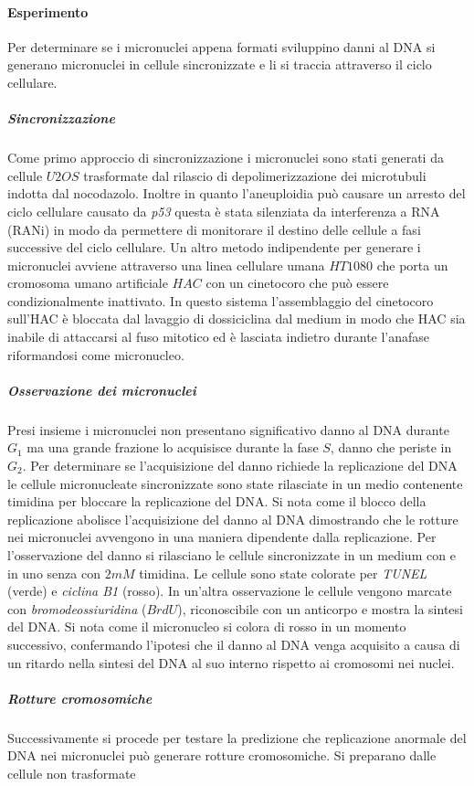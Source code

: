 \paragraph{Esperimento}
Per determinare se i micronuclei appena formati sviluppino danni al DNA si generano micronuclei in cellule sincronizzate e li si traccia attraverso il ciclo cellulare. 
\subparagraph{Sincronizzazione} 
Come primo approccio di sincronizzazione i micronuclei sono stati generati da cellule $U2OS$ trasformate dal rilascio di depolimerizzazione dei microtubuli indotta dal nocodazolo. 
Inoltre in quanto l'aneuploidia pu\`o causare un arresto del ciclo cellulare causato da \emph{p53} questa \`e stata silenziata da interferenza a RNA (RANi) in modo da permettere di 
monitorare il destino delle cellule a fasi successive del ciclo cellulare. Un altro metodo indipendente per generare i micronuclei avviene attraverso una linea cellulare umana $HT1080$ 
che porta un cromosoma umano artificiale $HAC$ con un cinetocoro che pu\`o essere condizionalmente inattivato. In questo sistema l'assemblaggio del cinetocoro sull'HAC \`e bloccata dal
lavaggio di dossiciclina dal medium in modo che HAC sia inabile di attaccarsi al fuso mitotico ed \`e lasciata indietro durante l'anafase riformandosi come micronucleo. 
\subparagraph{Osservazione dei micronuclei}
Presi insieme i micronuclei non presentano significativo danno al DNA durante $G_1$ ma una grande frazione lo acquisisce durante la fase $S$, danno che periste in $G_2$. Per determinare
se l'acquisizione del danno richiede la replicazione del DNA le cellule micronucleate sincronizzate sono state rilasciate in un medio contenente timidina per bloccare la replicazione del
DNA. Si nota come il blocco della replicazione abolisce l'acquisizione del danno al DNA dimostrando che le rotture nei micronuclei avvengono in una maniera dipendente dalla replicazione.
Per l'osservazione del danno si rilasciano le cellule sincronizzate in un medium con e in uno senza con $2mM$ timidina. Le cellule sono state colorate per \emph{TUNEL} (verde) e 
\emph{ciclina B1} (rosso). In un'altra osservazione le cellule vengono marcate con \emph{bromodeossiuridina} ($BrdU$), riconoscibile con un anticorpo e mostra la sintesi del DNA. Si
nota come il micronucleo si colora di rosso in un momento successivo, confermando l'ipotesi che il danno al DNA venga acquisito a causa di un ritardo nella sintesi del DNA al suo interno
rispetto ai cromosomi nei nuclei. 
\subparagraph{Rotture cromosomiche}
Successivamente si procede per testare la predizione che replicazione anormale del DNA nei micronuclei pu\`o generare rotture cromosomiche. Si preparano dalle cellule non trasformate
